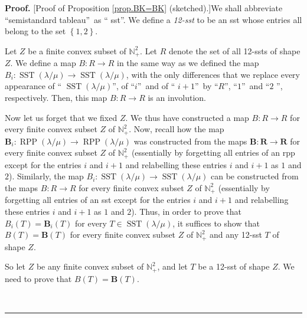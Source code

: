 \documentclass[numbers=enddot,12pt,final,onecolumn,notitlepage]{scrartcl}%
\theoremstyle{definition}
\newenvironment{proof}[1][Proof]{\noindent\textbf{#1.} }{\ \rule{0.5em}{0.5em}}
\begin{document}
\begin{proof}
[Proof of Proposition \ref{prop.BK=BK} (sketched).]We shall abbreviate
\textquotedblleft semistandard tableau\textquotedblright\ as \textquotedblleft
sst\textquotedblright. We define a \textit{12-sst} to be an sst whose entries
all belong to the set $\left\{  1,2\right\}  $.

Let $Z$ be a finite convex subset of $\mathbb{N}_{+}^{2}$. Let $R$ denote the
set of all 12-ssts of shape $Z$. We define a map $B:R\rightarrow R$ in the
same way as we defined the map $B_{i}:\operatorname*{SST}\left(  \lambda
/\mu\right)  \rightarrow\operatorname*{SST}\left(  \lambda/\mu\right)  $, with
the only differences that we replace every appearance of \textquotedblleft%
$\operatorname*{SST}\left(  \lambda/\mu\right)  $\textquotedblright, of
\textquotedblleft$i$\textquotedblright\ and of \textquotedblleft%
$i+1$\textquotedblright\ by \textquotedblleft$R$\textquotedblright,
\textquotedblleft$1$\textquotedblright\ and \textquotedblleft$2$%
\textquotedblright, respectively. Then, this map $B:R\rightarrow R$ is an involution.

Now let us forget that we fixed $Z$. We thus have constructed a map
$B:R\rightarrow R$ for every finite convex subset $Z$ of $\mathbb{N}_{+}^{2}$.
Now, recall how the map $\mathbf{B}_{i}:\operatorname*{RPP}\left(  \lambda
/\mu\right)  \rightarrow\operatorname*{RPP}\left(  \lambda/\mu\right)  $ was
constructed from the maps $\mathbf{B}:\mathbf{R}\rightarrow\mathbf{R}$ for
every finite convex subset $Z$ of $\mathbb{N}_{+}^{2}$ (essentially by
forgetting all entries of an rpp except for the entries $i$ and $i+1$ and
relabelling these entries $i$ and $i+1$ as $1$ and $2$). Similarly, the map
$B_{i}:\operatorname*{SST}\left(  \lambda/\mu\right)  \rightarrow
\operatorname*{SST}\left(  \lambda/\mu\right)  $ can be constructed from the
maps $B:R\rightarrow R$ for every finite convex subset $Z$ of $\mathbb{N}%
_{+}^{2}$ (essentially by forgetting all entries of an sst except for the
entries $i$ and $i+1$ and relabelling these entries $i$ and $i+1$ as $1$ and
$2$). Thus, in order to prove that $B_{i}\left(  T\right)  =\mathbf{B}%
_{i}\left(  T\right)  $ for every $T\in\operatorname*{SST}\left(  \lambda
/\mu\right)  $, it suffices to show that $B\left(  T\right)  =\mathbf{B}%
\left(  T\right)  $ for every finite convex subset $Z$ of $\mathbb{N}_{+}^{2}$
and any 12-sst $T$ of shape $Z$.

So let $Z$ be any finite convex subset of $\mathbb{N}_{+}^{2}$, and let $T$ be
a 12-sst of shape $Z$. We need to prove that $B\left(  T\right)
=\mathbf{B}\left(  T\right)  $.


\end{proof}
\end{document}
